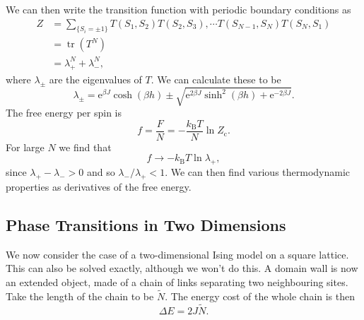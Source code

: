 \documentclass[fleqn]{NotesClass}
\newcommand*{\boltzmann}{k_{\mathrm{B}}}
\newcommand*{\cpartition}{Z_{\mathrm{c}}}
\newcommand*{\e}{\mathrm{e}}
\DeclareMathOperator{\tr}{tr}
\begin{document}
    We can then write the transition function with periodic boundary conditions as
    \begin{align}
        Z &= \sum_{\{S_i = \pm 1\}} T(S_1, S_2) T(S_2, S_3), \dotsm T(S_{N - 1}, S_N)T(S_N, S_1)\\
        &= \tr(T^N)\\
        &= \lambda_+^N + \lambda_-^N,
    \end{align}
    where \(\lambda_{\pm}\) are the eigenvalues of \(T\).
    We can calculate these to be
    \begin{equation}
        \lambda_{\pm} = \e^{\beta J} \cosh(\beta h) \pm \sqrt{\e^{2\beta J} \sinh^2(\beta h) + \e^{-2\beta J}}.
    \end{equation}
    The free energy per spin is
    \begin{equation}
        f = \frac{F}{N} = -\frac{\boltzmann T}{N}\ln \cpartition.
    \end{equation}
    For large \(N\) we find that
    \begin{equation}
        f \to -\boltzmann T \ln \lambda_+,
    \end{equation}
    since \(\lambda_{+} - \lambda_{-} > 0\) and so \(\lambda_-/\lambda_+ < 1\).
    We can then find various thermodynamic properties as derivatives of the free energy.
    
    \subsection{Phase Transitions in Two Dimensions}
    We now consider the case of a two-dimensional Ising model on a square lattice.
    This can also be solved exactly, although we won't do this.
    A domain wall is now an extended object, made of a chain of links separating two neighbouring sites.
    Take the length of the chain to be \(\tilde{N}\).
    The energy cost of the whole chain is then
    \begin{equation}
        \Delta E = 2J\tilde{N}.
    \end{equation}
    
\end{document}
